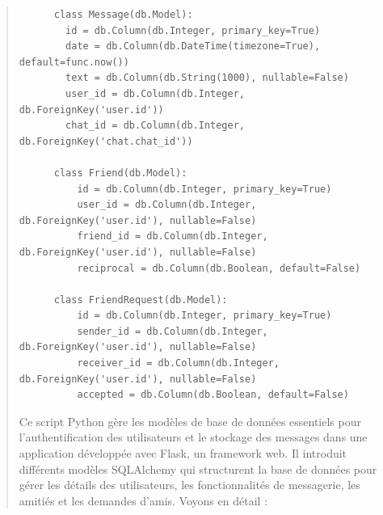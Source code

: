 \documentclass{article}
\begin{document}
\begin{quote}
\begin{tcolorbox}[colback=grisClair,colframe=black]
\begin{lstlisting}
      class Message(db.Model):
        id = db.Column(db.Integer, primary_key=True)
        date = db.Column(db.DateTime(timezone=True), default=func.now())
        text = db.Column(db.String(1000), nullable=False)
        user_id = db.Column(db.Integer, db.ForeignKey('user.id'))
        chat_id = db.Column(db.Integer, db.ForeignKey('chat.chat_id'))
      
      class Friend(db.Model):
          id = db.Column(db.Integer, primary_key=True)
          user_id = db.Column(db.Integer, db.ForeignKey('user.id'), nullable=False)
          friend_id = db.Column(db.Integer, db.ForeignKey('user.id'), nullable=False)
          reciprocal = db.Column(db.Boolean, default=False)
          
      class FriendRequest(db.Model):
          id = db.Column(db.Integer, primary_key=True)
          sender_id = db.Column(db.Integer, db.ForeignKey('user.id'), nullable=False)
          receiver_id = db.Column(db.Integer, db.ForeignKey('user.id'), nullable=False)
          accepted = db.Column(db.Boolean, default=False)
    \end{lstlisting}       
\end{tcolorbox}

\vspace*{1\baselineskip}
    
Ce script Python gère les modèles de base de données essentiels pour l'authentification des utilisateurs et le stockage des messages dans une application développée avec Flask, un framework web. 
Il introduit différents modèles SQLAlchemy qui structurent la base de données pour gérer les détails des utilisateurs, les fonctionnalités de messagerie, les amitiés et les demandes d'amis. Voyons en détail :


\end{quote}
\end{document}
